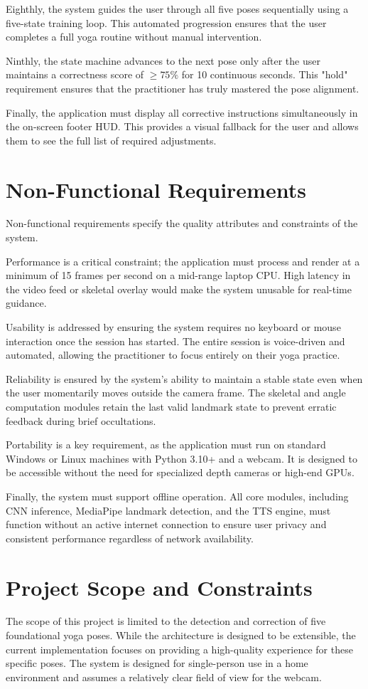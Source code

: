 Eighthly, the system guides the user through all five poses sequentially using a five-state training loop. This automated progression ensures that the user completes a full yoga routine without manual intervention.

Ninthly, the state machine advances to the next pose only after the user maintains a correctness score of $\geq 75\%$ for 10 continuous seconds. This "hold" requirement ensures that the practitioner has truly mastered the pose alignment.

Finally, the application must display all corrective instructions simultaneously in the on-screen footer HUD. This provides a visual fallback for the user and allows them to see the full list of required adjustments.

\section{Non-Functional Requirements}
Non-functional requirements specify the quality attributes and constraints of the system.

Performance is a critical constraint; the application must process and render at a minimum of 15 frames per second on a mid-range laptop CPU. High latency in the video feed or skeletal overlay would make the system unusable for real-time guidance.

Usability is addressed by ensuring the system requires no keyboard or mouse interaction once the session has started. The entire session is voice-driven and automated, allowing the practitioner to focus entirely on their yoga practice.

Reliability is ensured by the system's ability to maintain a stable state even when the user momentarily moves outside the camera frame. The skeletal and angle computation modules retain the last valid landmark state to prevent erratic feedback during brief occultations.

Portability is a key requirement, as the application must run on standard Windows or Linux machines with Python 3.10+ and a webcam. It is designed to be accessible without the need for specialized depth cameras or high-end GPUs.

Finally, the system must support offline operation. All core modules, including CNN inference, MediaPipe landmark detection, and the TTS engine, must function without an active internet connection to ensure user privacy and consistent performance regardless of network availability.

\section{Project Scope and Constraints}
The scope of this project is limited to the detection and correction of five foundational yoga poses. While the architecture is designed to be extensible, the current implementation focuses on providing a high-quality experience for these specific poses. The system is designed for single-person use in a home environment and assumes a relatively clear field of view for the webcam.

